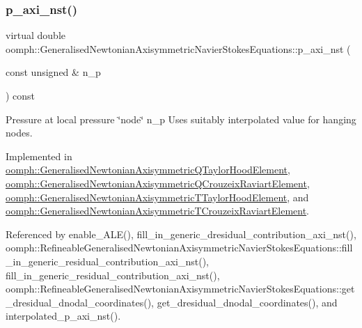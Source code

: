 \subsubsection{\texorpdfstring{p\+\_\+axi\+\_\+nst()}{p\_axi\_nst()}}
{\footnotesize\ttfamily virtual double oomph\+::\+Generalised\+Newtonian\+Axisymmetric\+Navier\+Stokes\+Equations\+::p\+\_\+axi\+\_\+nst (\begin{DoxyParamCaption}\item[{const unsigned \&}]{n\+\_\+p }\end{DoxyParamCaption}) const\hspace{0.3cm}{\ttfamily [pure virtual]}}



Pressure at local pressure \char`\"{}node\char`\"{} n\+\_\+p Uses suitably interpolated value for hanging nodes. 



Implemented in \hyperlink{classoomph_1_1GeneralisedNewtonianAxisymmetricQTaylorHoodElement_aaabd34755d0ea72214bb7cdd9cd4a7e6}{oomph\+::\+Generalised\+Newtonian\+Axisymmetric\+Q\+Taylor\+Hood\+Element}, \hyperlink{classoomph_1_1GeneralisedNewtonianAxisymmetricQCrouzeixRaviartElement_a09014883530f2debb0858fa669522c64}{oomph\+::\+Generalised\+Newtonian\+Axisymmetric\+Q\+Crouzeix\+Raviart\+Element}, \hyperlink{classoomph_1_1GeneralisedNewtonianAxisymmetricTTaylorHoodElement_a7567af3eef0ad8287999ba22ccd46892}{oomph\+::\+Generalised\+Newtonian\+Axisymmetric\+T\+Taylor\+Hood\+Element}, and \hyperlink{classoomph_1_1GeneralisedNewtonianAxisymmetricTCrouzeixRaviartElement_ab474b6d16da6b1519632c8e64585b040}{oomph\+::\+Generalised\+Newtonian\+Axisymmetric\+T\+Crouzeix\+Raviart\+Element}.



Referenced by enable\+\_\+\+A\+L\+E(), fill\+\_\+in\+\_\+generic\+\_\+dresidual\+\_\+contribution\+\_\+axi\+\_\+nst(), oomph\+::\+Refineable\+Generalised\+Newtonian\+Axisymmetric\+Navier\+Stokes\+Equations\+::fill\+\_\+in\+\_\+generic\+\_\+residual\+\_\+contribution\+\_\+axi\+\_\+nst(), fill\+\_\+in\+\_\+generic\+\_\+residual\+\_\+contribution\+\_\+axi\+\_\+nst(), oomph\+::\+Refineable\+Generalised\+Newtonian\+Axisymmetric\+Navier\+Stokes\+Equations\+::get\+\_\+dresidual\+\_\+dnodal\+\_\+coordinates(), get\+\_\+dresidual\+\_\+dnodal\+\_\+coordinates(), and interpolated\+\_\+p\+\_\+axi\+\_\+nst().

\mbox{\label{classoomph_1_1GeneralisedNewtonianAxisymmetricNavierStokesEquations_a1432210bfed0cd920d1fb1c4d9e73d3f}} 
